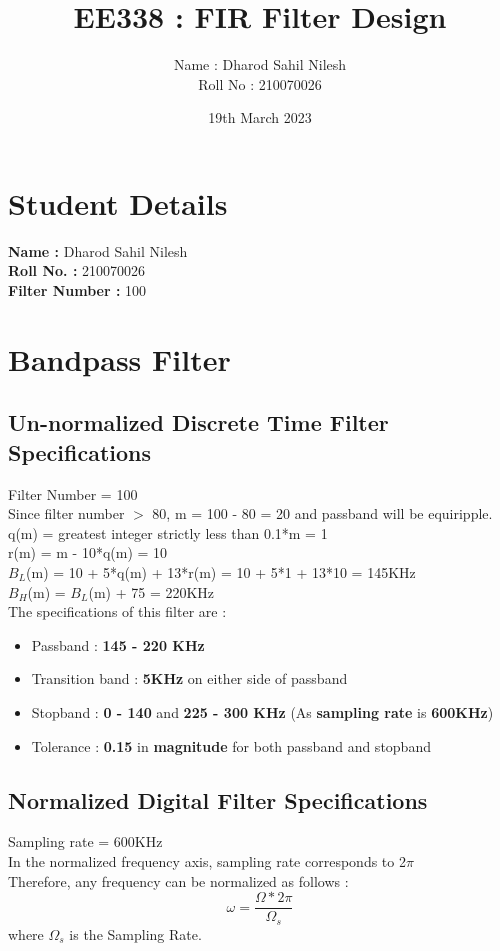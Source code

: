 \documentclass{article}
\title{EE338 : FIR Filter Design}
\author{Name : Dharod Sahil Nilesh \\ Roll No : 210070026 }
\date{19th March 2023}
\begin{document}
\maketitle


\section{\textbf{Student Details}}
\textbf{Name : }Dharod Sahil Nilesh\\
\textbf{Roll No. : }210070026\\
\textbf{Filter Number : }100

\section{\textbf{Bandpass Filter}}
\subsection{\textbf{Un-normalized Discrete Time Filter Specifications}}
Filter Number = 100\\
Since filter number $>$ 80, m = 100 - 80 = 20 and passband will be equiripple.\\
q(m) = greatest integer strictly less than 0.1*m = 1\\
r(m) = m - 10*q(m) = 10\\
$B_L$(m) = 10 + 5*q(m) + 13*r(m) = 10 + 5*1 + 13*10 = 145KHz \\
$B_H$(m) = $B_L$(m) + 75 = 220KHz\\

\vspace{1.5em}
\noindent
The specifications of this filter are :
\begin{itemize}
    \item Passband : \textbf{145 - 220 KHz}
    \item  Transition band : \textbf{5KHz} on either side of passband
    \item Stopband : \textbf{0 - 140}  and  \textbf{225 - 300 KHz} (As \textbf{sampling rate} is \textbf{600KHz})

    \item  Tolerance : \textbf{0.15} in \textbf{magnitude} for both passband and stopband
\end{itemize}


\subsection{Normalized Digital Filter Specifications}
Sampling rate = 600KHz\\
In the normalized frequency axis, sampling rate corresponds to 2$\pi$\\
\newpage
Therefore, any frequency can be normalized as follows :
\begin{equation*}
    \omega = \frac{\Omega*2\pi}{\Omega_s}
\end{equation*}
where $\Omega_s$ is the Sampling Rate.\\
\end{document}
